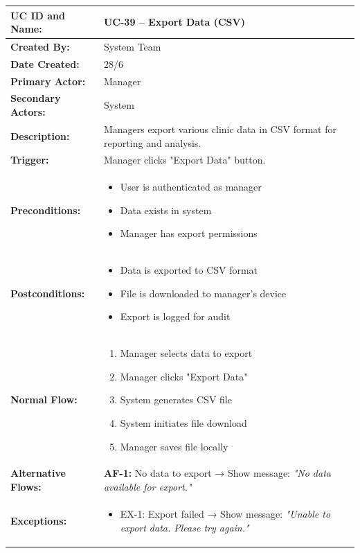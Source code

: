 \documentclass[12pt,a4paper]{article}
\begin{document}
\renewcommand{\arraystretch}{1.5}
\begin{longtable}{|p{4.5cm}|p{10.5cm}|}
\hline
\textbf{UC ID and Name:} & UC-39 – Export Data (CSV) \\
\hline
\textbf{Created By:} & System Team \\
\hline
\textbf{Date Created:} & 28/6 \\
\hline
\textbf{Primary Actor:} & Manager \\
\hline
\textbf{Secondary Actors:} & System \\
\hline
\textbf{Description:} & Managers export various clinic data in CSV format for reporting and analysis. \\
\hline
\textbf{Trigger:} & Manager clicks "Export Data" button. \\
\hline
\textbf{Preconditions:} &
\begin{itemize}
  \item User is authenticated as manager
  \item Data exists in system
  \item Manager has export permissions
\end{itemize} \\
\hline
\textbf{Postconditions:} &
\begin{itemize}
  \item Data is exported to CSV format
  \item File is downloaded to manager's device
  \item Export is logged for audit
\end{itemize} \\
\hline
\textbf{Normal Flow:} &
\begin{enumerate}
  \item Manager selects data to export
  \item Manager clicks "Export Data"
  \item System generates CSV file
  \item System initiates file download
  \item Manager saves file locally
\end{enumerate} \\
\hline
\textbf{Alternative Flows:} &
\textbf{AF-1:} No data to export → Show message: \textit{"No data available for export."} \\
\hline
\textbf{Exceptions:} &
\begin{itemize}
  \item EX-1: Export failed → Show message: \textit{"Unable to export data. Please try again."}

\end{itemize}
\end{longtable}
\end{document}
